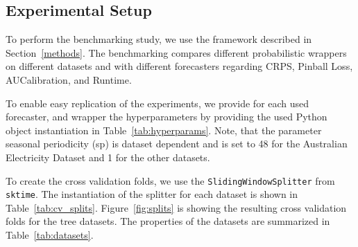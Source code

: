 \subsection{Experimental Setup}
To perform the benchmarking study, we use the framework described in Section~\ref{methods}. The benchmarking compares different probabilistic wrappers on different datasets and with different forecasters regarding CRPS, Pinball Loss, AUCalibration, and Runtime. 

To enable easy replication of the experiments, we provide for each used forecaster, and wrapper the hyperparameters by providing the used Python object instantiation in Table~\ref{tab:hyperparams}. Note, that the parameter seasonal periodicity (sp) is dataset dependent and is set to 48 for the Australian Electricity Dataset and 1 for the other datasets.

To create the cross validation folds, we use the \texttt{SlidingWindowSplitter} from \texttt{sktime}. The instantiation of the splitter for each dataset is shown in Table~\ref{tab:cv_splits}. Figure~\ref{fig:splits} is showing the resulting cross validation folds for the tree datasets. The properties of the datasets are summarized in Table~\ref{tab:datasets}.



